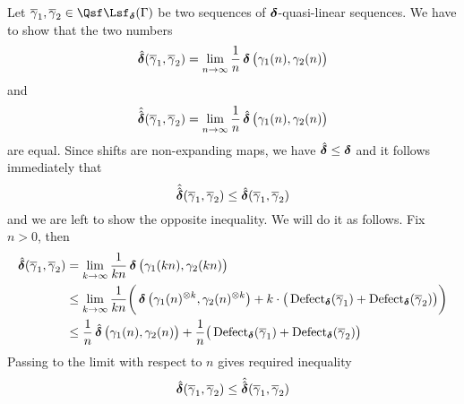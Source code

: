 \begin{Proof}
  Let $\bar\gamma_{1},\bar\gamma_{2}\in\qlin_{\dist}(\Gamma)$ be two
  sequences of $\operatorname{{\bm\delta}}$-quasi-linear sequences.  We have to show that the
  two numbers
  \[
  \operatorname{\hat{\bm\delta}}(\overline\gamma_{1},\overline\gamma_{2})
  =
  \lim_{n\stackrel{}{\rightarrow}\infty}\frac1n \operatorname{{\bm\delta}}\big(\gamma_{1}(n),\gamma_{2}(n)\big)
  \]
  and
  \[
  \operatorname{\hat{\hat{\bm\delta}}}(\overline\gamma_{1},\overline\gamma_{2})
  =
  \lim_{n\stackrel{}{\rightarrow}\infty}\frac1n \operatorname{\hat{\bm\delta}}\big(\gamma_{1}(n),\gamma_{2}(n)\big)
  \]
  are equal.  Since shifts are non-expanding maps, we have
  $\operatorname{\hat{\bm\delta}}\leq\operatorname{{\bm\delta}}$ and it follows immediately that
  \[
  \operatorname{\hat{\hat{\bm\delta}}}(\overline\gamma_{1},\overline\gamma_{2})
  \leq
  \operatorname{\hat{\bm\delta}}(\overline\gamma_{1},\overline\gamma_{2})
  \]
  and we are left to show the opposite inequality.
  We will do it as follows. Fix $n>0$, then
  \begin{align*}
    \operatorname{\hat{\bm\delta}}(\overline\gamma_{1},\overline\gamma_{2})
    &=
    \lim_{k\stackrel{}{\rightarrow}\infty}\frac{1}{kn}\operatorname{{\bm\delta}}\big(\gamma_1(kn),\gamma_{2}(kn)\big)\\
    &\leq
    \lim_{k\stackrel{}{\rightarrow}\infty}\frac{1}{kn}
    \bigg(
    \operatorname{{\bm\delta}}\big(\gamma_1(n)^{\otimes k},\gamma_{2}(n)^{\otimes k}\big)
    +
    k\cdot\big(
    \operatorname{\mathrm{Defect}}_{\operatorname{{\bm\delta}}}(\overline\gamma_{1})
    +
    \operatorname{\mathrm{Defect}}_{\operatorname{{\bm\delta}}}(\overline\gamma_{2})
    \big)
    \bigg)\\
    &\leq
    \frac1n\operatorname{\hat{\bm\delta}}\big(\gamma_{1}(n),\gamma_{2}(n)\big)
    +
    \frac1n\big(\operatorname{\mathrm{Defect}}_{\operatorname{{\bm\delta}}}(\overline\gamma_{1})
    +
    \operatorname{\mathrm{Defect}}_{\operatorname{{\bm\delta}}}(\overline\gamma_2)\big)
  \end{align*}
  Passing to the limit with respect to $n$ gives required inequality
  \[
  \operatorname{\hat{\bm\delta}}(\overline\gamma_{1},\overline\gamma_{2})
  \leq
  \operatorname{\hat{\hat{\bm\delta}}}(\overline\gamma_{1},\overline\gamma_{2})
  \]
\end{Proof}




